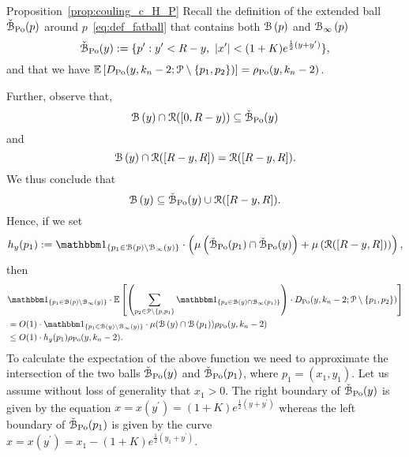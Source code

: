 \begin{proofof}{Proposition~\ref{prop:couling_c_H_P}}
Recall the definition of the extended ball $\check{{\mathcal B}}_{{\mathrm{Po}}}(p)$ around $p$~\eqref{eq:def_fatball} that contains both ${\mathcal B}\left(p\right)$ and ${\mathcal B}_{\infty}\left(p\right)$ 
\[
	\check{{\mathcal B}}_{{\mathrm{Po}}}(y) : = \{ p^\prime : y^\prime < R - y, \ |x^\prime| < (1+K) e^{\frac{1}{2} (y + y^\prime)}  \},
\]
and that we have $\mathbb{E}\left[D_{{\mathrm{Po}}} (y,k_n-2;{\mathcal P} \setminus \{ p_1,p_2\})\right] = \rho_{{\mathrm{Po}}}(y,k_n-2)$.

Further, observe that,
\begin{equation*} %
\BallHyp{y} \cap \Rcal ([0,R-y)) \subseteq \FatBallHyp{y}
\end{equation*}
and 
\begin{equation*} %
\BallHyp{y} \cap \Rcal ([R-y,R]) = \Rcal ([R-y,R]).
\end{equation*}
We thus conclude that 
\begin{equation} \label{eq:ball_inclusions}
{\mathcal B}\left(y\right) \subseteq \check{{\mathcal B}}_{{\mathrm{Po}}}(y) \cup {\mathcal R}([R-y,R]).
\end{equation}
Hence, if we set 
\[
h_y(p_1) := \ind{p_1 \in \BallHyp{p}\setminus \BallPo{y}} \cdot    
\left( \mu \left( \FatBallHyp{p_1} \cap \FatBallHyp{y} \right)
+ \mu \left( \Rcal([R-y,R]) \right) \right),
\]
then 
\begin{align*}
&\ind{p_1\in \BallHyp{p}\setminus \BallPo{y}} \cdot \Exp{ \left(\sum_{p_2 \in \Pcal \setminus 
\{p,p_1\}} \ind{p_2 \in \BallHyp{y} \cap \BallPo{p_1}}\right) \cdot 
D_{\Po} (y,k_n-2;\Pcal \setminus \{ p_1, p_2\})
} \\
&=O(1)\cdot
\ind{p_1\in \BallHyp{y}\setminus \BallPo{y}} \cdot \mu (\BallHyp{y}\cap \BallHyp{p_1}) \rho_{\Po}(y,k_n-2) \\
& \leq O(1) \cdot  h_y (p_1) \rho_{\Po}(y,k_n-2) . 
\end{align*}
To calculate the expectation of the above function we need to approximate the 
intersection of the two balls $\check{{\mathcal B}}_{{\mathrm{Po}}}(y)$ and $\check{{\mathcal B}}_{{\mathrm{Po}}}(p_1)$, 
where $p_1= (x_1,y_1)$. 
Let us assume without loss of generality that $x_1 > 0$. 
The right boundary of $\check{{\mathcal B}}_{{\mathrm{Po}}}(y)$ is given by the equation 
$x = x(y^\prime) = (1+K)e^{\frac{1}{2} (y + y^\prime)}$ whereas the left boundary of $\check{{\mathcal B}}_{{\mathrm{Po}}}(p_1)$ is given by the curve $x = x(y^\prime)= x_1 - (1+ K)e^{\frac{1}{2} (y_1 + y^\prime)}.$ 


\end{proofof}
